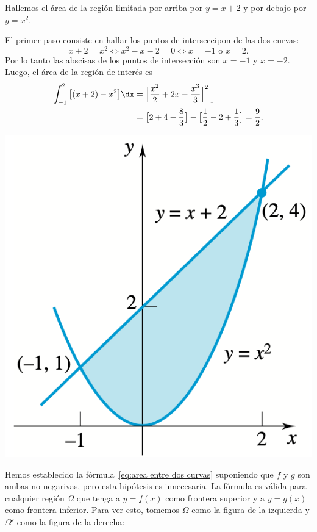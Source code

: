 \begin{example}
  Hallemos el área de la región limitada por arriba por $y=x+2$ y por debajo por $y=x^2$.

  \noindent
  \begin{minipage}{.65\textwidth}
    El primer paso consiste en hallar los puntos de interseccipon de las dos curvas:
    \[
    x+2=x^2 \iff x^2-x-2=0 \iff x=-1 \text{ o } x=2.
    \]
    Por lo tanto las abscisas de los puntos de intersección son $x=-1$ y $x=-2$.
    Luego, el área de la región de interés es
    \begin{align*}
      \int_{-1}^2 \big[(x+2)-x^2\big]\dx 
      &= \Big[\frac{x^2}2+2x-\frac{x^3}3\Big]_{-1}^2
      \\ 
      &= \big[ 2 + 4 - \frac83\big]-\big[\frac12-2+\frac13\big]=\frac92.
    \end{align*}
  \end{minipage}
  \begin{minipage}{.34\textwidth}
    \includegraphics[width=.95\textwidth]{pics/areas-3.png}
  \end{minipage}
  \end{example}

  Hemos establecido la fórmula~\eqref{eq:area entre dos curvas} suponiendo que $f$ y $g$ son ambas no negarivas, pero esta hipótesis es innecesaria. La fórmula es válida para cualquier región $\Omega$ que tenga a $y=f(x)$ como frontera superior y a $y=g(x)$ como frontera inferior.
  Para ver esto, tomemos $\Omega$ como la figura de la izquierda y $\Omega'$ como la figura de la derecha:

